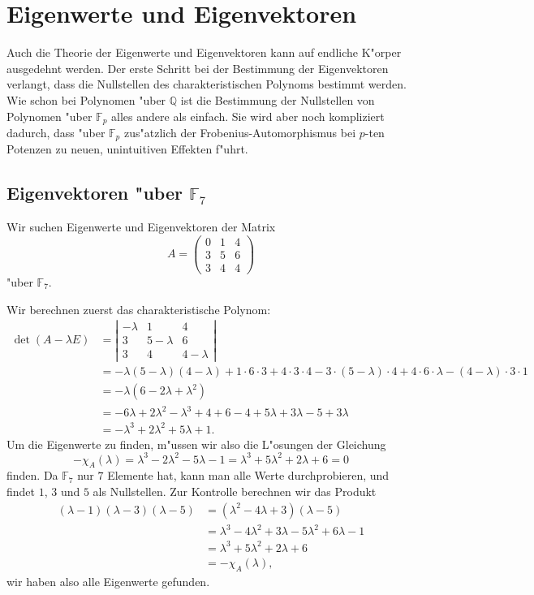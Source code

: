 %
%
%
\section{Eigenwerte und Eigenvektoren}
Auch die Theorie der Eigenwerte und Eigenvektoren kann auf endliche K"orper
ausgedehnt werden.
Der erste Schritt bei der Bestimmung der Eigenvektoren verlangt, dass
die Nullstellen des charakteristischen Polynoms bestimmt werden.
Wie schon bei Polynomen "uber $\mathbb Q$ ist die Bestimmung der Nullstellen
von Polynomen "uber $\mathbb F_p$ alles andere als einfach.
Sie wird aber noch kompliziert dadurch, dass "uber $\mathbb F_p$
zus"atzlich der Frobenius-Automorphismus bei $p$-ten Potenzen zu
neuen, unintuitiven Effekten f"uhrt.

\subsection{Eigenvektoren "uber $\mathbb F_7$}
Wir suchen Eigenwerte und Eigenvektoren der Matrix
\[
A
=
\begin{pmatrix}
0&1&4\\
3&5&6\\
3&4&4
\end{pmatrix}
\]
"uber $\mathbb F_7$.

Wir berechnen zuerst das charakteristische Polynom:
\begin{align*}
\det(A-\lambda E)
&
=
\left|\begin{matrix}
-\lambda&1        &4\\
3       &5-\lambda&6\\
3       &4        &4-\lambda
\end{matrix}\right|
\\
&=
-\lambda(5-\lambda)(4-\lambda)
+1\cdot6\cdot3
+4\cdot3\cdot 4
-3\cdot(5-\lambda)\cdot 4
+4\cdot6\cdot\lambda
-(4-\lambda)\cdot3\cdot 1
\\
&=
-\lambda(6-2\lambda+\lambda^2)
\\
&=
-6\lambda+2\lambda^2-\lambda^3
+4
+6
-4+5\lambda
+3\lambda
-5+3\lambda
\\
&=
-\lambda^3+2\lambda^2+5\lambda+1.
\end{align*}
Um die Eigenwerte zu finden, m"ussen wir also die L"osungen der
Gleichung
\[
-\chi_A(\lambda)
=
\lambda^3
-2\lambda^2
-5\lambda
-1
=
\lambda^3
+5\lambda^2
+2\lambda
+6
=
0
\]
finden.
Da $\mathbb F_7$ nur $7$ Elemente hat, kann man alle Werte durchprobieren,
und findet $1$, $3$ und $5$ als Nullstellen.
Zur Kontrolle berechnen wir das Produkt
\begin{align*}
(\lambda -1)(\lambda-3)(\lambda-5)
&
=
(\lambda^2-4\lambda+3)(\lambda-5)
\\
&=
\lambda^3-4\lambda^2+3\lambda
-5\lambda^2+6\lambda-1
\\
&=
\lambda^3+5\lambda^2+2\lambda+6
\\
&=
-\chi_A(\lambda),
\end{align*}
wir haben also alle Eigenwerte gefunden.


